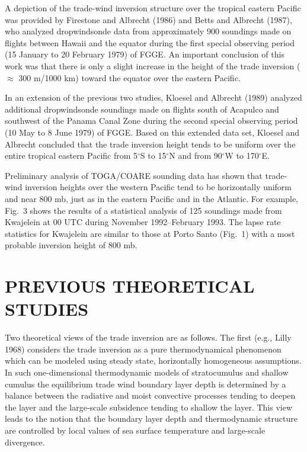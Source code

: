      A depiction of the trade-wind inversion structure over the tropical
eastern Pacific was provided by Firestone and Albrecht (1986) and Betts and
Albrecht (1987), who analyzed dropwindsonde data from approximately 900
soundings made on flights between Hawaii and the equator during the first
special observing period (15 January to 20 February 1979) of FGGE. 
An important conclusion of this work was that there is only a
slight increase in the height of the trade inversion ($\approx$ 300 m/1000 km)
toward the equator over the eastern Pacific.

     In an extension of the previous two studies, Kloesel and Albrecht (1989) 
analyzed additional dropwindsonde soundings made on flights south of Acapulco
and southwest of the Panama Canal Zone during the second special observing
period (10 May to 8 June 1979) of FGGE.  Based on this extended data set,
Kloesel and Albrecht concluded that the trade inversion height tends to be
uniform over the entire tropical eastern Pacific from 5$^\circ$S to
15$^\circ$N and from 90$^\circ$W to 170$^\circ$E. 

    Preliminary analysis of TOGA/COARE sounding data has shown
that trade-wind inversion heights over the
western Pacific tend to be horizontally uniform and near 800 mb, just as in
the eastern Pacific and in the Atlantic.  For example, Fig.~3 shows
the results of a statistical analysis of 125 soundings made from Kwajelein
at 00 UTC during November 1992--February 1993. 
The lapse rate statistics for Kwajelein are similar to those at Porto Santo
(Fig.~1) with a most probable inversion height of 800 mb.

\section{PREVIOUS THEORETICAL STUDIES}
 
     Two theoretical views of the trade inversion are as follows.  The first
(e.g., Lilly 1968) considers the
trade inversion as a pure thermodynamical phenomenon which can be modeled
using steady state, horizontally homogeneous assumptions. In such
one-dimensional thermodynamic models of stratocumulus and shallow cumulus the
equilibrium trade wind boundary layer depth is determined by a balance between
the radiative and moist convective processes tending to deepen the layer and
the large-scale subsidence tending to shallow the layer. This view leads to
the notion that the boundary layer depth and thermodynamic structure are
controlled by local values of sea surface temperature and large-scale
divergence.  


